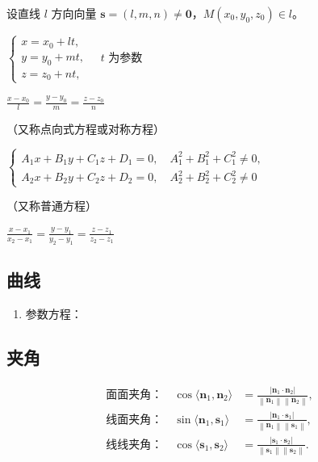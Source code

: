 \documentclass[UTF8,fontset=fandol,zihao=5]{ctexart}
\newcommand{\norm}[1]{\left\lVert#1\right\rVert}
\begin{document}
设直线 $l$ 方向向量 $\bm s=(l,m,n)\ne\bm 0$，$M(x_0,y_0,z_0)\in l$。

\begin{description}[style=multiline,leftmargin=7em,labelwidth=6em,itemsep=0.7em]
  \item[参数方程]
  $\displaystyle
  \begin{cases}
    x=x_0+lt,\\
    y=y_0+mt,\\
    z=z_0+nt,
  \end{cases}\quad t\text{ 为参数}$

  \item[标准方程]
  $\displaystyle\frac{x-x_0}{l}=\frac{y-y_0}{m}=\frac{z-z_0}{n}$

  \hfill（又称点向式方程或对称方程）

  \item[一般方程]
  $\displaystyle
  \begin{cases}
    A_1x+B_1y+C_1z+D_1=0,\quad A_1^2+B_1^2+C_1^2\ne0,\\
    A_2x+B_2y+C_2z+D_2=0,\quad A_2^2+B_2^2+C_2^2\ne0
  \end{cases}$

  \hfill（又称普通方程）

  \item[两点式方程]
  $\displaystyle\frac{x-x_1}{x_2-x_1}=\frac{y-y_1}{y_2-y_1}=\frac{z-z_1}{z_2-z_1}$
\end{description}


\subsection{曲线}

\begin{enumerate}
  \item 参数方程：
\end{enumerate}
\subsection{夹角}

\begin{align*}
\text{面面夹角：}\quad
\cos\langle\bm n_1,\bm n_2\rangle
&=\frac{|\bm n_1\cdot\bm n_2|}{\norm{\bm n_1}\norm{\bm n_2}},\\[0.4em]
\text{线面夹角：}\quad
\sin\langle\bm n_1,\bm s_1\rangle
&=\frac{|\bm n_1\cdot\bm s_1|}{\norm{\bm n_1}\norm{\bm s_1}},\\[0.4em]
\text{线线夹角：}\quad
\cos\langle\bm s_1,\bm s_2\rangle
&=\frac{|\bm s_1\cdot\bm s_2|}{\norm{\bm s_1}\norm{\bm s_2}}.
\end{align*}
\end{document}
